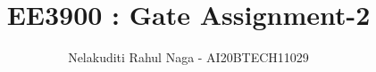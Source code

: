 \documentclass[journal,12pt,twocolumn]{IEEEtran}
\DeclareMathOperator*{\Res}{Res}
\begin{document}
\newcommand{\BEQA}{\begin{eqnarray}}
\newcommand{\EEQA}{\end{eqnarray}}
\newcommand{\define}{\stackrel{\triangle}{=}}

\raggedbottom
\setlength{\parindent}{0pt}
\providecommand{\mbf}{\mathbf}
\providecommand{\pr}[1]{\ensuremath{\Pr\left(#1\right)}}
\providecommand{\qfunc}[1]{\ensuremath{Q\left(#1\right)}}
\providecommand{\sbrak}[1]{\ensuremath{{}\left[#1\right]}}
\providecommand{\lsbrak}[1]{\ensuremath{{}\left[#1\right.}}
\providecommand{\rsbrak}[1]{\ensuremath{{}\left.#1\right]}}
\providecommand{\brak}[1]{\ensuremath{\left(#1\right)}}
\providecommand{\lbrak}[1]{\ensuremath{\left(#1\right.}}
\providecommand{\rbrak}[1]{\ensuremath{\left.#1\right)}}
\providecommand{\cbrak}[1]{\ensuremath{\left\{#1\right\}}}
\providecommand{\lcbrak}[1]{\ensuremath{\left\{#1\right.}}
\providecommand{\rcbrak}[1]{\ensuremath{\left.#1\right\}}}
\theoremstyle{remark}
\newtheorem{rem}{Remark}
\newcommand{\sgn}{\mathop{\mathrm{sgn}}}
\providecommand{\abs}[1]{\vert#1\vert}
\providecommand{\res}[1]{\Res\displaylimits_{#1}} 
\providecommand{\norm}[1]{\lVert#1\rVert}
\providecommand{\mtx}[1]{\mathbf{#1}}
\providecommand{\mean}[1]{E[ #1 ]}
\providecommand{\fourier}{\overset{\mathcal{F}}{ \rightleftharpoons}}
\providecommand{\system}{\overset{\mathcal{H}}{ \longleftrightarrow}}
\newcommand{\solution}{\noindent \textbf{Solution: }}
\newcommand{\cosec}{\,\text{cosec}\,}
\providecommand{\dec}[2]{\ensuremath{\overset{#1}{\underset{#2}{\gtrless}}}}
\newcommand{\myvec}[1]{\ensuremath{\begin{pmatrix}#1\end{pmatrix}}}
\newcommand{\mydet}[1]{\ensuremath{\begin{vmatrix}#1\end{vmatrix}}}
\makeatletter
{}
\makeatother
\let\StandardTheFigure\thefigure
\let\vec\mathbf
\renewcommand{\thefigure}{\theproblem}
\def\putbox#1#2#3{\makebox[0in][l]{\makebox[#1][l]{}\raisebox{\baselineskip}[0in][0in]{\raisebox{#2}[0in][0in]{#3}}}}
     \def\rightbox#1{\makebox[0in][r]{#1}}
     \def\centbox#1{\makebox[0in]{#1}}
     \def\topbox#1{\raisebox{-\baselineskip}[0in][0in]{#1}}
     \def\midbox#1{\raisebox{-0.5\baselineskip}[0in][0in]{#1}}
\vspace{3cm}
\title{ EE3900 : Gate Assignment-2}
\author{Nelakuditi Rahul Naga - AI20BTECH11029}
\end{document}
